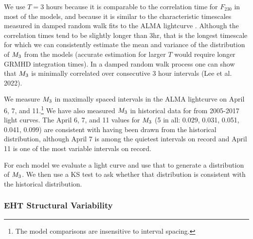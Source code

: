 We use $T = 3$ hours because it is comparable to the correlation time for $F_{230}$ in most of the models, and because it is similar to the characteristic timescales measured in damped random walk fits to the ALMA lightcurve \citep[see Table 10 of][]{Wielgus2022}.  Although the correlation times tend to be slightly longer than $3$hr, that is the longest timescale for which we can consistently estimate the mean and variance of the distribution of $M_{3}$ from the models (accurate estimation for larger $T$ would require longer GRMHD integration times).  In a damped random walk process one can show that $M_{3}$ is minimally correlated over consecutive 3 hour intervals (Lee et al. 2022).

We measure $M_{3}$ in maximally spaced intervals in the ALMA lightcurve on April 6, 7, and 11.\footnote{The model comparisons are insensitive to interval spacing.}  We have also measured $M_{3}$ in historical data for \sgra from 2005-2017 light curves.  The April 6, 7, and 11 values for $M_{3}$ (5 in all: 0.029, 0.031, 0.051, 0.041, 0.099) are consistent with having been drawn from the historical distribution, although April 7 is among the quietest intervals on record and April 11 is one of the most variable intervals on record.

For each model we evaluate a light curve and use that to generate a distribution of $M_{3}$.  We then use a KS test to ask whether that distribution is consistent with the historical distribution.

\subsubsection{EHT Structural Variability}



